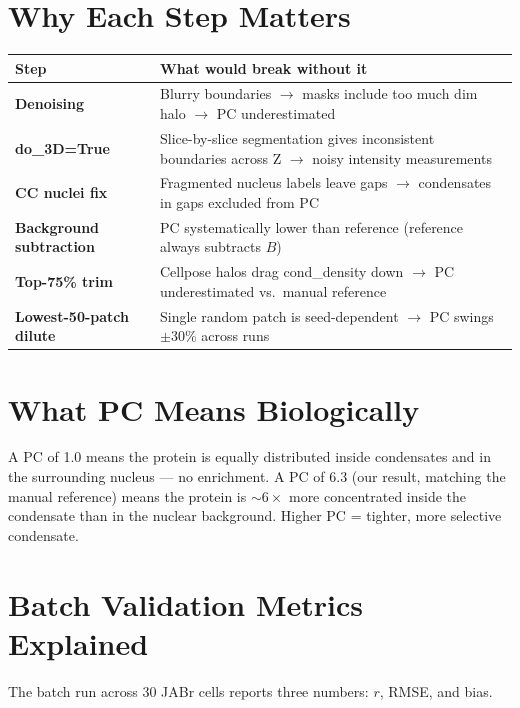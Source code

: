 \documentclass[11pt]{article}
\begin{document}
\section*{Why Each Step Matters}

\vspace{4pt}
\begin{tabular}{>{\bfseries}p{4.5cm} p{10cm}}
\toprule
Step & What would break without it \\
\midrule
Denoising & Blurry boundaries $\to$ masks include too much dim halo $\to$ PC underestimated \\[4pt]
do\_3D=True & Slice-by-slice segmentation gives inconsistent boundaries across Z $\to$ noisy intensity measurements \\[4pt]
CC nuclei fix & Fragmented nucleus labels leave gaps $\to$ condensates in gaps excluded from PC \\[4pt]
Background subtraction & PC systematically lower than reference (reference always subtracts $B$) \\[4pt]
Top-75\% trim & Cellpose halos drag cond\_density down $\to$ PC underestimated vs.\ manual reference \\[4pt]
Lowest-50-patch dilute & Single random patch is seed-dependent $\to$ PC swings $\pm$30\% across runs \\
\bottomrule
\end{tabular}

\section*{What PC Means Biologically}

A PC of 1.0 means the protein is equally distributed inside condensates and in the surrounding nucleus --- no enrichment. A PC of 6.3 (our result, matching the manual reference) means the protein is ${\sim}6\times$ more concentrated inside the condensate than in the nuclear background. Higher PC = tighter, more selective condensate.

\section*{Batch Validation Metrics Explained}

The batch run across 30 JABr cells reports three numbers: $r$, RMSE, and bias.
\end{document}
